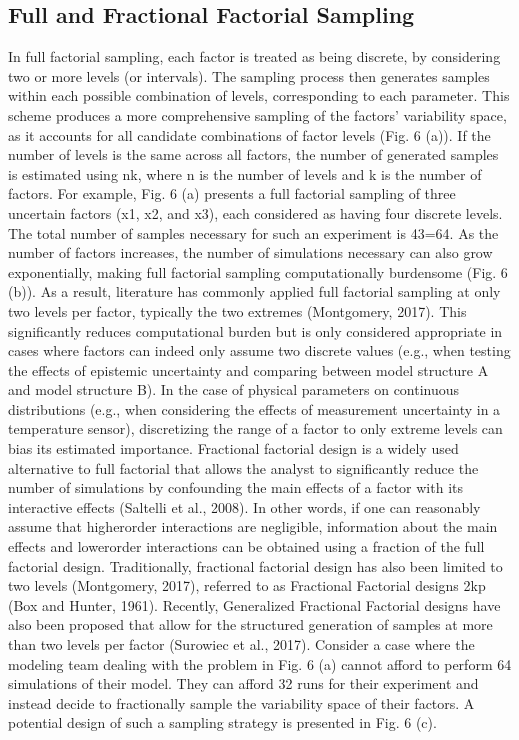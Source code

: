 \documentclass[letterpaper,10pt,english]{sphinxmanual}
\begin{document}
\subsection{Full and Fractional Factorial Sampling}
\label{\detokenize{3_sensitivity_analysis_the_basics:full-and-fractional-factorial-sampling}}
\sphinxAtStartPar
In full factorial sampling, each factor is treated as being discrete, by considering two or more levels (or intervals). The sampling process then generates samples within each possible combination of levels, corresponding to each parameter. This scheme produces a more comprehensive sampling of the factors’ variability space, as it accounts for all candidate combinations of factor levels (Fig. 6 (a)). If the number of levels is the same across all factors, the number of generated samples is estimated using nk, where n is the number of levels and k is the number of factors. For example, Fig. 6 (a) presents a full factorial sampling of three uncertain factors (x1, x2, and x3), each considered as having four discrete levels. The total number of samples necessary for such an experiment is 43=64. As the number of factors increases, the number of simulations necessary can also grow exponentially, making full factorial sampling computationally burdensome (Fig. 6 (b)). As a result, literature has commonly applied full factorial sampling at only two levels per factor, typically the two extremes (Montgomery, 2017). This significantly reduces computational burden but is only considered appropriate in cases where factors can indeed only assume two discrete values (e.g., when testing the effects of epistemic uncertainty and comparing between model structure A and model structure B). In the case of physical parameters on continuous distributions (e.g., when considering the effects of measurement uncertainty in a temperature sensor), discretizing the range of a factor to only extreme levels can bias its estimated importance.
Fractional factorial design is a widely used alternative to full factorial that allows the analyst to significantly reduce the number of simulations by confounding the main effects of a factor with its interactive effects (Saltelli et al., 2008). In other words, if one can reasonably assume that higher\sphinxhyphen{}order interactions are negligible, information about the main effects and lower\sphinxhyphen{}order interactions can be obtained using a fraction of the full factorial design. Traditionally, fractional factorial design has also been limited to two levels (Montgomery, 2017), referred to as Fractional Factorial designs 2k\sphinxhyphen{}p (Box and Hunter, 1961). Recently, Generalized Fractional Factorial designs have also been proposed that allow for the structured generation of samples at more than two levels per factor (Surowiec et al., 2017). Consider a case where the modeling team dealing with the problem in Fig. 6 (a) cannot afford to perform 64 simulations of their model. They can afford 32 runs for their experiment and instead decide to fractionally sample the variability space of their factors. A potential design of such a sampling strategy is presented in Fig. 6 (c).
\end{document}
